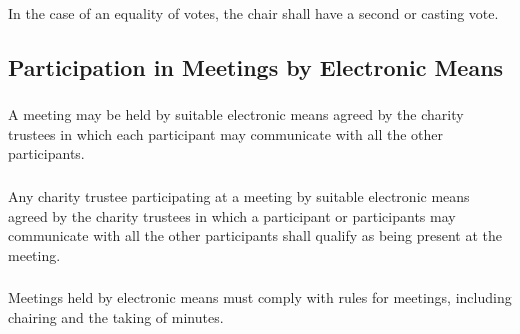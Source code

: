         \subsubsection{}
        In the case of an equality of votes, the chair shall have a second or casting vote.

    \subsection{Participation in Meetings by Electronic Means}

        \subsubsection{}
        A meeting may be held by suitable electronic means agreed by the charity trustees in which each participant may communicate with all the other participants.

        \subsubsection{}
        Any charity trustee participating at a meeting by suitable electronic means agreed by the charity trustees in which a participant or participants may communicate with all the other participants shall qualify as being present at the meeting.

        \subsubsection{}
        Meetings held by electronic means must comply with rules for meetings, including chairing and the taking of minutes.

